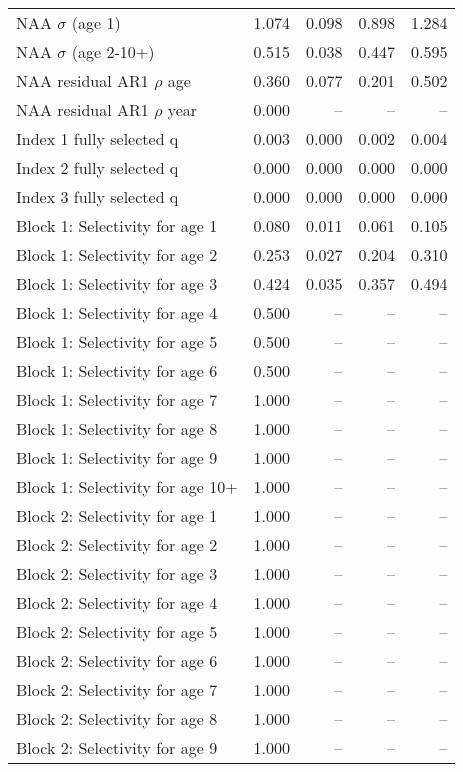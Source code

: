 \documentclass[
]{article}
\begin{document}
\begin{landscape}
\begin{longtable}[t]{lrrrr}
\endfoot
\bottomrule
\endlastfoot
NAA $\sigma$ (age 1) & 1.074 & 0.098 & 0.898 & 1.284\\
NAA $\sigma$ (age 2-10+) & 0.515 & 0.038 & 0.447 & 0.595\\
NAA residual AR1 $\rho$ age & 0.360 & 0.077 & 0.201 & 0.502\\
NAA residual AR1 $\rho$ year & 0.000 & -- & -- & --\\
Index 1 fully selected q & 0.003 & 0.000 & 0.002 & 0.004\\
\addlinespace
Index 2 fully selected q & 0.000 & 0.000 & 0.000 & 0.000\\
Index 3 fully selected q & 0.000 & 0.000 & 0.000 & 0.000\\
Block 1: Selectivity for age 1 & 0.080 & 0.011 & 0.061 & 0.105\\
Block 1: Selectivity for age 2 & 0.253 & 0.027 & 0.204 & 0.310\\
Block 1: Selectivity for age 3 & 0.424 & 0.035 & 0.357 & 0.494\\
\addlinespace
Block 1: Selectivity for age 4 & 0.500 & -- & -- & --\\
Block 1: Selectivity for age 5 & 0.500 & -- & -- & --\\
Block 1: Selectivity for age 6 & 0.500 & -- & -- & --\\
Block 1: Selectivity for age 7 & 1.000 & -- & -- & --\\
Block 1: Selectivity for age 8 & 1.000 & -- & -- & --\\
\addlinespace
Block 1: Selectivity for age 9 & 1.000 & -- & -- & --\\
Block 1: Selectivity for age 10+ & 1.000 & -- & -- & --\\
Block 2: Selectivity for age 1 & 1.000 & -- & -- & --\\
Block 2: Selectivity for age 2 & 1.000 & -- & -- & --\\
Block 2: Selectivity for age 3 & 1.000 & -- & -- & --\\
\addlinespace
Block 2: Selectivity for age 4 & 1.000 & -- & -- & --\\
Block 2: Selectivity for age 5 & 1.000 & -- & -- & --\\
Block 2: Selectivity for age 6 & 1.000 & -- & -- & --\\
Block 2: Selectivity for age 7 & 1.000 & -- & -- & --\\
Block 2: Selectivity for age 8 & 1.000 & -- & -- & --\\
\addlinespace
Block 2: Selectivity for age 9 & 1.000 & -- & -- & --\\

\end{longtable}
\end{landscape}
\end{document}

